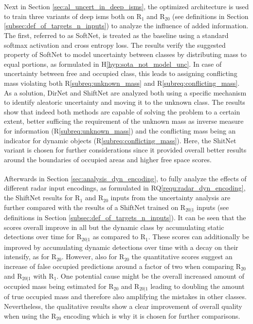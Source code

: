 \\\\
Next in Section \ref{sec:al_uncert_in_deep_isms}, the optimized architecture is used to train three variants of deep \gls{ism}s both on R$_1$ and R$_{20}$ (see definitions in Section \ref{subsec:def_of_targets_n_inputs}) to analyze the influence of added information. The first, referred to as SoftNet, is treated as the baseline using a standard softmax activation and cross entropy loss. The results verify the suggested property of SoftNet to model uncertainty between classes by distributing mass to equal portions, as formulated in H\ref{hyp:sota_not_model_unc}. In case of uncertainty between free and occupied class, this leads to assigning conflicting mass violating both R\ref{subreq:unknown_mass} and R\ref{subreq:conflicting_mass}. As a solution, DirNet and ShiftNet are analyzed both using a specific mechanism to identify aleatoric uncertainty and moving it to the unknown class. The results show that indeed both methods are capable of solving the problem to a certain extent, better sufficing the requirement of the unknown mass as inverse measure for information (R\ref{subreq:unknown_mass}) and the conflicting mass being an indicator for dynamic objects (R\ref{subreq:conflicting_mass}). Here, the ShitNet variant is chosen for further considerations since it provided overall better results around the boundaries of occupied areas and higher free space scores.
\\\\
Afterwards in Section \ref{sec:analysis_dyn_encoding}, to fully analyze the effects of different radar input encodings, as formulated in RQ\ref{requ:radar_dyn_encoding}, the ShiftNet results for R$_1$ and R$_{20}$ inputs from the uncertainty analysis are further compared with the results of a ShiftNet trained on R$_{20|1}$ inputs (see definitions in Section \ref{subsec:def_of_targets_n_inputs}). It can be seen that the scores overall improve in all but the dynamic class by accumulating static detections over time for R$_{20|1}$ as compared to R$_1$. These scores can additionally be improved by accumulating dynamic detections over time with a decay on their intensify, as for R$_{20}$. However, also for R$_{20}$ the quantitative scores suggest an increase of false occupied predictions around a factor of two when comparing R$_{20}$ and R$_{20|1}$ with R$_1$. One potential cause might be the overall increased amount of occupied mass being estimated for R$_{20}$ and R$_{20|1}$ leading to doubling the amount of true occupied mass and therefore also amplifying the mistakes in other classes. Nevertheless, the qualitative results show a clear improvement of overall quality when using the R$_{20}$ encoding which is why it is chosen for further comparisons.
